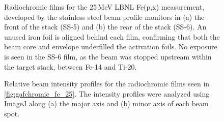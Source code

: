 % 
\begin{figure}
    \centering
    \caption{ Radiochromic films for the 25\,MeV LBNL Fe(p,x) measurement, developed by the stainless steel beam profile monitors in (a) the front of the stack (SS-5) and (b) the rear of the stack (SS-6). An unused iron foil is aligned behind each film, confirming that both the beam core and envelope underfilled the activation foils. No exposure is seen in the SS-6 film, as the beam was stopped upstream within the target stack, between Fe-14 and Ti-20.}
     \label{fig:gafchromic_fe_25}
\end{figure}




\begin{figure}
    \centering
    \caption{Relative beam intensity profiles for the radiochromic films seen in \autoref{fig:gafchromic_fe_25}. The intensity profiles were analyzed using ImageJ along (a) the major axis and (b) minor axis of each beam spot. }
     \label{fig:gafchromic_fe_profiles_25}
\end{figure}




